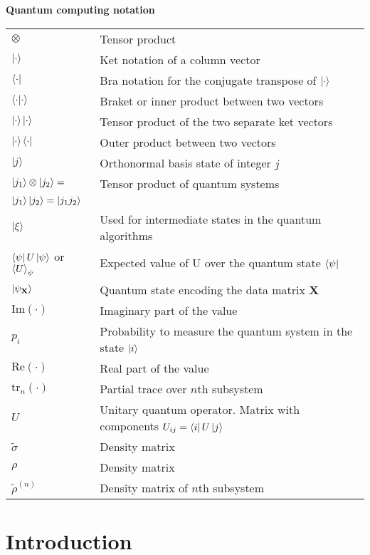 \documentclass[10pt]{article}
\begin{document}
	\centerline{\bf Quantum computing notation}
	\bgroup
	\def\arraystretch{1.5}
	\begin{tabular}{p{1.25in}p{4in}}
		$\otimes$ & Tensor product \\
		$\ket{\cdot}$ & Ket notation of a column vector \\
		$\bra{\cdot}$ & Bra notation for the conjugate transpose of $\ket{\cdot}$\\
		$\braket{\cdot|\cdot}$ & Braket or inner product between two vectors \\
		$\ket{\cdot}\ket{\cdot}$ & Tensor product of the two separate ket vectors \\
		$\ket{\cdot}\bra{\cdot}$ & Outer product between two vectors\\
		$\ket{j}$ & Orthonormal basis state of integer $j$\\
		$\ket{j_1}\otimes\ket{j_2} =$  & Tensor product of quantum systems\\
		$ \ket{j_1}\ket{j_2} = \ket{j_1 j_2}$ &\\
		$\ket{\xi}$ & Used for intermediate states in the quantum algorithms\\
		$\bra{\psi}U \ket{\psi}$ or $\braket{U}_\psi$ & Expected value of U over the quantum state $\bra{\psi}$\\
		$\ket{\psi_\mathbf{X}}$ & Quantum state encoding the data matrix $\mathbf{X} $\\
		$ \mathrm{Im}\left(\cdot\right)$ & Imaginary part of the value \\
		$p_i$ & Probability to measure the quantum system in the state $\ket{i}$\\
		$ \mathrm{Re}\left(\cdot\right)$ & Real part of the value \\
		
		$\mathrm{tr}_{n}\left(\cdot\right)$ & Partial trace over $n$th subsystem \\
		$U$ & Unitary quantum operator. Matrix with components $U_{ij}=\bra{i}U\ket{j}$ \\
		$\tilde{\sigma}$ & Density matrix \\
		$\rho$ & Density matrix \\
		$\tilde{\rho}^{(n)}$ & Density matrix of $n$th subsystem 
	\end{tabular}
	\egroup
	\vspace{0.25cm}
	
	\color{black}
	
	\section{\label{sec:Introduction} Introduction}
	
\end{document}
